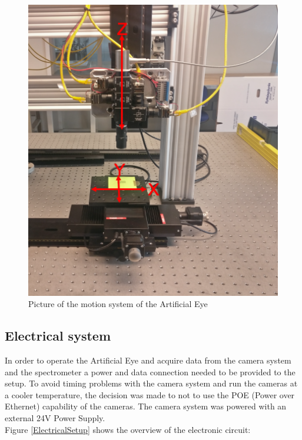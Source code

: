 \begin{figure}
\begin{center}
\includegraphics[width=12cm]{Pictures/MotionSystem}
\caption[Picture of the motion system of the Artificial Eye]{Picture of the motion system of the Artificial Eye}
\label{MotionSystem}
\end{center}
\end{figure}


\subsection{Electrical system}
In order to operate the Artificial Eye and acquire data from the camera system and the spectrometer a power and data connection needed to be provided to the setup. To avoid timing problems with the camera system and run the cameras at a cooler temperature, the decision was made to not to use the POE (Power over Ethernet) capability of the cameras. The camera system was powered with an external 24V Power Supply.\\ 
Figure \ref{ElectricalSetup} shows the overview of the electronic circuit:

